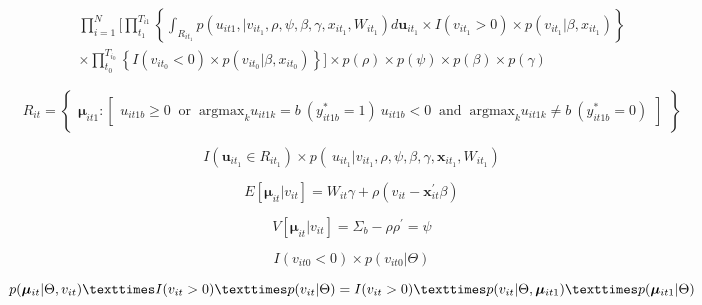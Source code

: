 \documentclass[11pt]{jsarticle}
\begin{document}
\begin{equation}
\begin{split}
 \prod_{i=1}^{N}\Biggl[
  \prod_{t_{1}}^{T_{i1}} \left\{
   \int_{R_{it_{1}}} p(u_{it1},|v_{it_{1}},\rho,\psi,\beta,\gamma,x_{it_{1}}, W_{it_{1}})
   d {\boldsymbol u}_{it_{1}} \times I(v_{it_{1}}>0) \times p(v_{it_{1}}|\beta,x_{it_{1}})  
  \right\} \\
  \times \prod_{t_{0}}^{T_{i_{0}}}\left\{
   I(v_{it_{0}}<0)×p(v_{it_{0}}|\beta,x_{it_{0}})
  \right\}
 \Biggr]
 ×p(\rho)×p(\psi)×p(\beta)×p(\gamma)
\end{split}
\end{equation}

\begin{equation} \label{formula32}
R_{it} =
\begin{Bmatrix}
{\boldsymbol\mu}_{it1} :
\begin{bmatrix}
u_{it1b} \geq 0 \;\; \mbox{or} \;\; \mbox{argmax}_{k}u_{it1k} = b \
(y^\ast_{it1b} = 1) \
u_{it1b} < 0 \;\; \mbox{and} \;\; \mbox{argmax}_{k}u_{it1k} \neq b \
(y^\ast_{it1b} = 0)
\end{bmatrix}
\end{Bmatrix}
\end{equation}

\begin{equation}\label{formula33}
I({\boldsymbol u}_{it_{1}}\in R_{it_{1}})×p({\boldsymbol\ u}_{it_{1}}|v_{it_{1}},\rho,\psi,\beta,\gamma,\textbf{x}_{it_{1}},W_{it_{1}})
\end{equation}

\begin{equation}\label{formula34}
E[{\boldsymbol\mu}_{it}|v_{it}]=W_{it}\gamma+\rho(v_{it}-\textbf{x}_{it}^{'}\beta)
\end{equation}

\begin{equation}\label{formula35}
V[{\boldsymbol\mu}_{it}|v_{it}]=\Sigma_{b}-\rho\rho^{'}=\psi
\end{equation}

\begin{equation}\label{formula36}
I(v_{it0}<0)×p(v_{it0}|\Theta)
\end{equation}

\begin{equation}\label{formula37}
p({\boldsymbol\mu}_{it}|\Theta,v_{it})×I(v_{it}>0)×p(v_{it}|\Theta)\\
=I(v_{it}>0)×p(v_{it}|\Theta,{\boldsymbol\mu}_{it1})×p({\boldsymbol\mu}_{it1}|\Theta)
\end{equation}
\end{document}
